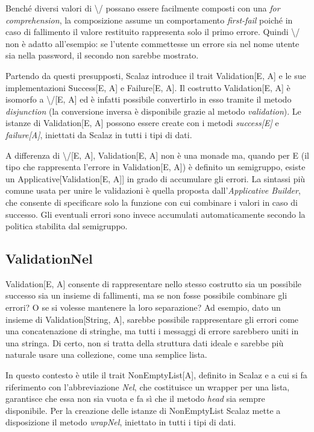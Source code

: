 Benché diversi valori di \textbackslash/ possano essere facilmente composti con una \textit{for comprehension}, la composizione assume un comportamento \textit{first-fail} poiché in caso di fallimento il valore restituito rappresenta solo il primo errore. Quindi \textbackslash/ non è adatto all'esempio: se l'utente commettesse un errore sia nel nome utente sia nella password, il secondo non sarebbe mostrato.

Partendo da questi presupposti, Scalaz introduce il trait Validation[E, A] e le sue implementazioni Success[E, A] e Failure[E, A]. Il costrutto Validation[E, A] è isomorfo a \textbackslash/[E, A] ed è infatti possibile convertirlo in esso tramite il metodo \textit{disjunction} (la conversione inversa è disponibile grazie al metodo \textit{validation}). Le istanze di Validation[E, A] possono essere create con i metodi \textit{success[E]} e \textit{failure[A]}, iniettati da Scalaz in tutti i tipi di dati.

A differenza di \textbackslash/[E, A], Validation[E, A] non è una monade ma, quando per E (il tipo che rappresenta l'errore in Validation[E, A]) è definito un semigruppo, esiste un Applicative[Validation[E, A]] in grado di accumulare gli errori. La sintassi più comune usata per unire le validazioni è quella proposta dall'\textit{Applicative Builder}, che consente di specificare solo la funzione con cui combinare i valori in caso di successo. Gli eventuali errori sono invece accumulati automaticamente secondo la politica stabilita dal semigruppo.



\subsection{ValidationNel}

Validation[E, A] consente di rappresentare nello stesso costrutto sia un possibile successo sia un insieme di fallimenti, ma se non fosse possibile combinare gli errori? O se si volesse mantenere la loro separazione? Ad esempio, dato un insieme di Validation[String, A], sarebbe possibile rappresentare gli errori come una concatenazione di stringhe, ma tutti i messaggi di errore sarebbero uniti in una stringa. Di certo, non si tratta della struttura dati ideale e sarebbe più naturale usare una collezione, come una semplice lista.

In questo contesto è utile il trait NonEmptyList[A], definito in Scalaz e a cui si fa riferimento con l'abbreviazione \textit{Nel}, che costituisce un wrapper per una lista, garantisce che essa non sia vuota e fa sì che il metodo \textit{head} sia sempre disponibile. Per la creazione delle istanze di NonEmptyList Scalaz mette a disposizione il metodo \textit{wrapNel}, iniettato in tutti i tipi di dati.

